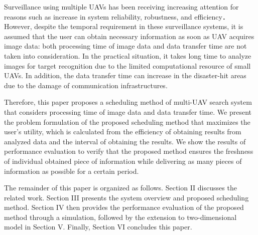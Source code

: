 \documentclass[journal]{IEEEtran}
\begin{document}
Surveillance using multiple UAVs has been receiving increasing attention for reasons such as increase in system reliability, robustness, and efficiency\cite{Lanillos2014,Maza2007,Meng2014,chang2016,Mirzaei2011}．
However, despite the temporal requirement in these surveillance systems, it is assumed that the user can obtain necessary information as soon as UAV acquires image data: both processing time of image data and data transfer time are not taken into consideration. In the practical situation, it takes long time to analyze images for target recognition due to the limited computational resource of small UAVs. In addition, the data transfer time can increase in the disaster-hit areas due to the damage of communication infrastructures.

Therefore, this paper proposes a scheduling method of multi-UAV search system that considers processing time of image data and data transfer time.
We present the problem formulation of the proposed scheduling method that maximizes the user’s utility, which is calculated from the efficiency of obtaining results from analyzed data and the interval of obtaining the results.
We show the results of performance evaluation to verify that the proposed method ensures the freshness of individual obtained piece of information while delivering as many pieces of information as possible for a certain period.

The remainder of this paper is organized as follows. Section II discusses the related work. Section III presents the system overview and proposed scheduling method. Section IV then provides the performance evaluation of the proposed method through a simulation, followed by the extension to two-dimensional model in Section V. Finally, Section VI concludes this paper.
%
%
%
%
%
%
%
%
%
%
%
%
\end{document}
